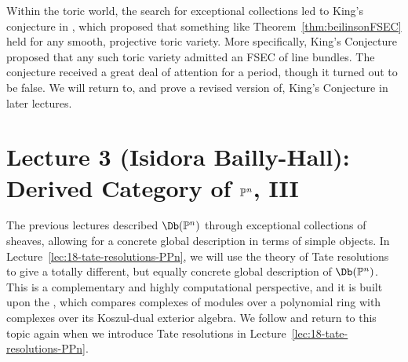 \documentclass{amsart}
\begin{document}
Within the toric world, the search for exceptional collections led to King's conjecture in \cite{King97}, which proposed that something like Theorem~\ref{thm:beilinsonFSEC} held for any smooth, projective toric variety.  More specifically, King's Conjecture proposed that any such toric variety admitted an FSEC of line bundles.  The conjecture received a great deal of attention for a period, though it turned out to be false.  We will return to, and prove a revised version of, King's Conjecture in later lectures.

\section{Lecture 3 (Isidora Bailly-Hall): Derived Category of $\mathbb P^n$, III}\label{lec:3-DbPPn}

The previous lectures described $\Db(\PP^n)$ through exceptional collections of sheaves, allowing for a concrete global description in terms of simple objects. In Lecture~\ref{lec:18-tate-resolutions-PPn}, we will use the theory of Tate resolutions to give a totally different, but equally concrete global description of $\Db(\PP^n)$.  
This is a complementary and highly computational perspective, and it is built upon the  \cite{BGG78}, which compares complexes of modules over a polynomial ring with complexes over its Koszul-dual exterior algebra. We follow \cite[\S2]{EFS03} and return to this topic again when we introduce Tate resolutions in Lecture~\ref{lec:18-tate-resolutions-PPn}.
\end{document}
